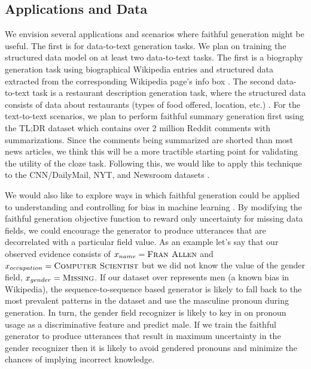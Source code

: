 
 \subsection{Applications and Data}
We envision several applications and scenarios where faithful generation might
be useful. The first is for data-to-text generation tasks. We plan on 
training the structured data model on at least two data-to-text tasks. 
The first is a biography generation task using biographical Wikipedia
entries and structured data extracted from the corresponding Wikipedia page's
info box \citep{lebret2016neural}. The second data-to-text task is a 
restaurant description generation task, where the structured data consists
of data about restaurants (types of food offered, location, etc.) 
\citep{novikova2017e2e}.
For the text-to-text scenarios, we plan to perform faithful summary generation
first using the TL;DR dataset \citep{volske2017tl} which contains over 2 
million
Reddit comments with summarizations. Since the comments being summarized
are shorted than most news articles, we think this will be a more tractible
starting point for validating the utility of the cloze task.
Following this, we would like to apply this technique to
the CNN/DailyMail, NYT, and Newsroom datasets 
\citep{hermann2015teaching,sandhaus2008new,grusky2018newsroom}.


We would also like to explore ways in which faithful generation could 
be applied to understanding and controlling for bias in machine learning
\citep{bolukbasi2016man}. By modifying the faithful generation objective
function to reward only uncertainty for missing data fields, we could 
encourage the generator to produce utterances that are decorrelated with 
a particular field value. 
As an example let's say that our observed evidence consists
of $x_{name} = \textsc{Fran Allen}$ and  
$x_{occupation} = \textsc{Computer Scientist}$
but we did not know the value of the gender field, 
$x_{gender} = \textsc{Missing} $. If our dataset over 
represents men (a known bias in Wikipedia), 
the sequence-to-sequence based generator is 
likely to fall back to the most prevalent patterns in the dataset and use
the masculine pronoun during generation. In turn, 
the gender field recognizer is likely
to key in on pronoun usage as a discriminative feature and predict male.
If we train the faithful generator to produce utterances that result in
maximum uncertainty in the gender 
recognizer then it is likely to avoid gendered pronouns and minimize
the chances of implying incorrect knowledge.
